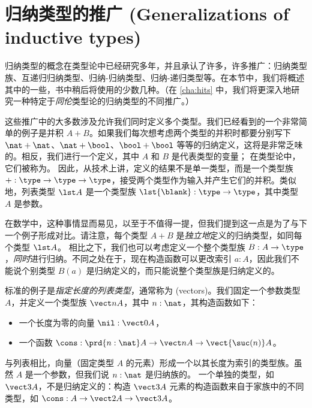 \section{归纳类型的推广 (Generalizations of inductive types)}
\label{sec:generalizations}

%
归纳类型的概念在类型论中已经研究多年，并且承认了许多，许多推广：归纳类型族、互递归归纳类型、归纳-归纳类型、归纳-递归类型等。在本节中，我们将概述其中的一些，书中稍后将使用的少数几种。（在 \cref{cha:hits} 中，我们将更深入地研究一种特定于\emph{同伦}类型论的归纳类型的不同推广。）

这些推广中的大多数涉及允许我们同时定义多个类型。我们已经看到的一个非常简单的例子是并积 $A+B$。如果我们每次想考虑两个类型的并积时都要分别写下 $\nat+\nat$、$\nat+\bool$、$\bool+\bool$ 等等的归纳定义，这将是非常乏味的。相反，我们进行一个定义，其中 $A$ 和 $B$ 是代表类型的变量；
%
在类型论中，它们被称为。%
因此，从技术上讲，定义的结果不是单一类型，而是一个类型族 $+ : \type\to\type\to\type$，接受两个类型作为输入并产生它们的并积。类似地，列表类型 $\lst A$ 是一个类型族 $\lst{\blank}:\type\to\type$，其中类型 $A$ 是参数。

在数学中，这种事情显而易见，以至于不值得一提，但我们提到这一点是为了与下一个例子形成对比。请注意，每个类型 $A+B$ 是\emph{独立地}定义的归纳类型，如同每个类型 $\lst A$。%
%
%
相比之下，我们也可以考虑定义一个整个类型族 $B:A\to\type$，\emph{同时}进行归纳。不同之处在于，现在构造函数可以更改索引 $a:A$，因此我们不能说个别类型 $B(a)$ 是归纳定义的，而只能说整个类型族是归纳定义的。

%
%
标准的例子是\emph{指定长度的列表类型}，通常称为 (vectors)。我们固定一个参数类型 $A$，并定义一个类型族 $\vect n A$，其中 $n:\nat$，其构造函数如下：
\begin{itemize}
    \item 一个长度为零的向量 $\nil:\vect 0 A$，
    \item 一个函数 $\cons:\prd{n:\nat} A\to \vect n A \to \vect{\suc (n)} A$。
\end{itemize}
与列表相比，向量（固定类型 $A$ 的元素）形成一个以其长度为索引的类型族。虽然 $A$ 是一个参数，但我们说 $n:\nat$ 是归纳族的。%
%
一个单独的类型，如 $\vect3A$，不是归纳定义的：构造 $\vect3A$ 元素的构造函数来自于家族中的不同类型，如 $\cons:A \to \vect2A \to \vect3A$。

